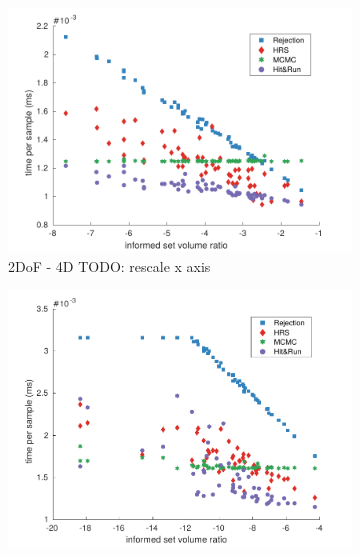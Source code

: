 \documentclass[letterpaper, 10 pt, conference]{ieeeconf}  %
\begin{document}
\begin{figure}[t!]
	\centering
	\begin{subfigure}[b]{0.32\textwidth}
		\includegraphics[width=\linewidth]{fig/sampling_efficiency/sample_efficiency_2d}
		\caption{2DoF - 4D TODO: rescale x axis}
		\label{fig:sampling_efficiency:2d}
	\end{subfigure}
	\begin{subfigure}[b]{0.32\textwidth}
		\includegraphics[width=\linewidth]{fig/sampling_efficiency/sample_efficiency_6d}

\end{subfigure}
\end{figure}
\end{document}
